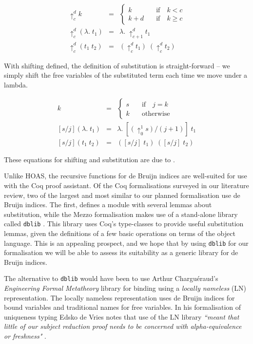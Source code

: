 \documentclass[]{unswthesis}
\newcommand{\SSPHS}{\text{SSPHS }}
\let\c\texttt
\begin{document}
\begin{eqnarray*}
\uparrow^d_c k & = &
	\begin{cases}
	k \quad & \text{if} \quad k < c \\
	k + d \quad & \text{if} \quad k \geq c
	\end{cases}\\
\uparrow^d_c (\lambda. \; t_1) & = & \lambda. \; \uparrow^d_{c + 1} t_1\\
\uparrow^d_c (t_1 \; t_2) & = & (\uparrow^d_c t_1) \; (\uparrow^d_c t_2)
\end{eqnarray*}

With shifting defined, the definition of substitution is straight-forward -- we simply shift the free variables of the substituted term each time we move under a lambda.

\begin{eqnarray*}
[s/j]k & = &
	\begin{cases}
	s \quad & \text{if} \quad j = k \\
	k \quad & \text{otherwise}
	\end{cases}\\
\left[s/j\right](\lambda. \; t_1) & = & \lambda. \; [(\uparrow^1_0 s)/(j + 1)] \; t_1\\
\left[s/j\right](t_1 \; t_2) & = & ([s/j] \; t_1) \; ([s/j] \; t_2)
\end{eqnarray*}

These equations for shifting and substitution are due to \cite{tapl}.

Unlike HOAS, the recursive functions for de Bruijn indices are well-suited for use with the Coq proof assistant. Of the Coq formalisations surveyed in our literature review, two of the largest and most similar to our planned formalisation use de Bruijn indices. The first, \SSPHS \cite{pottier13} defines a module with several lemmas about substitution, while the Mezzo formalisation \cite{mezzo14} makes use of a stand-alone library called \c{dblib} \cite{dblib13}. This library uses Coq's type-classes to provide useful substitution lemmas, given the definitions of a few basic operations on terms of the object language. This is an appealing prospect, and we hope that by using \c{dblib} for our formalisation we will be able to assess its suitability as a generic library for de Bruijn indices.

The alternative to \c{dblib} would have been to use Arthur Chargu\'{e}raud's \textit{Engineering Formal Metatheory} library \cite{aydemir08} for binding using a \textit{locally nameless} (LN) representation. The locally nameless representation uses de Bruijn indices for bound variables and traditional names for free variables. In his formalisation of uniqueness typing Edsko de Vries notes that use of the LN library \textit{``meant that little of our subject reduction proof needs to be concerned with alpha-equivalence or freshness"} \cite{deVries07}.
\end{document}
